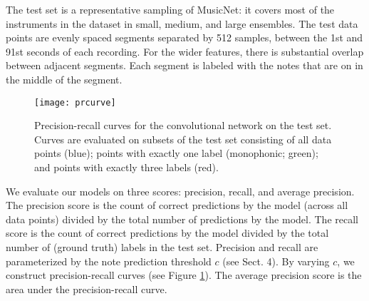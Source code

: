 \documentclass{article} \usepackage{iclr2017_conference,times}
\begin{document}
The test set is a representative sampling of MusicNet: it covers most of the instruments in the dataset in small, medium, and large ensembles.  The test data points are evenly spaced segments separated by 512 samples, between the 1st and 91st seconds of each recording. For the wider features, there is substantial overlap between adjacent segments. Each segment is labeled with the notes that are on in the middle of the segment.

\begin{figure}[h]
  \centering
  \texttt{[image: prcurve]}
  \caption{Precision-recall curves for the convolutional network on the test set. Curves are evaluated on subsets of the test set consisting of all data points (blue); points with exactly one label (monophonic; green); and points with exactly three labels (red).}
  \label{pr_curve}
\end{figure}

We evaluate our models on three scores: precision, recall, and average precision. The precision score is the count of correct predictions by the model (across all data points) divided by the total number of predictions by the model. The recall score is the count of correct predictions by the model divided by the total number of (ground truth) labels in the test set. Precision and recall are parameterized by the note prediction threshold $c$ (see Sect. 4). By varying $c$, we construct precision-recall curves (see Figure \ref{pr_curve}). The average precision score is the area under the precision-recall curve.
\end{document}
